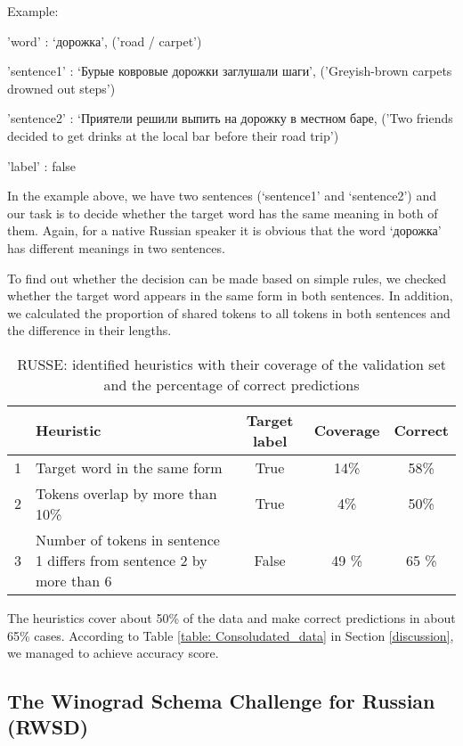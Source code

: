 \documentclass[11pt]{article}
\begin{document}
\begin{flushleft}
Example:

'word' : {\foreignlanguage{russian}{`дорожка'}}, ('road / carpet')

'sentence1' : {\foreignlanguage{russian}{`Бурые ковровые дорожки заглушали шаги'}}, ('Greyish-brown carpets drowned out steps')
  
'sentence2' : {\foreignlanguage{russian}{`Приятели решили выпить на дорожку в местном баре}}, ('Two friends decided to get drinks at the local bar before their road trip')

'label' : false
\end{flushleft}

In the example above, we have two sentences (`sentence1' and `sentence2') and our task is to decide whether the target word has the same meaning in both of them. Again, for a native Russian speaker it is obvious that the word \foreignlanguage{russian}{`дорожка'} has different meanings in two sentences. 

To find out whether the decision can be made based on simple rules, we checked whether the target word appears in the same form in both sentences. In addition, we calculated the proportion of shared tokens to all tokens in both sentences and the difference in their lengths.

\begin{table}[ht]
\centering
\begin{tabular}{|c|p{}|c|c|c|}
\hline
& \textbf{Heuristic} & \textbf{Target label} & \textbf{Coverage} & \textbf{Correct} \\
\hline
1 & Target word in the same form & True & 14\% & 58\% \\
\hline
2 & Tokens overlap by more than 10\%& True& 4\% & 50\% \\
\hline 
3 & Number of tokens in sentence 1 differs from sentence 2 by more than 6 & False & 49 \% & 65 \% \\
\hline
\end{tabular}
\caption{RUSSE: identified heuristics with their coverage of the validation set and the percentage of correct predictions}
\label{table:RUSSE_heuristics}
\end{table}

The heuristics cover about 50\% of the data and make correct predictions in about 65\% cases. According to Table \ref{table: Consoludated_data} in Section \ref{discussion}, we managed to achieve  accuracy score.

\subsection{The Winograd Schema Challenge for Russian (RWSD)}
\end{document}
